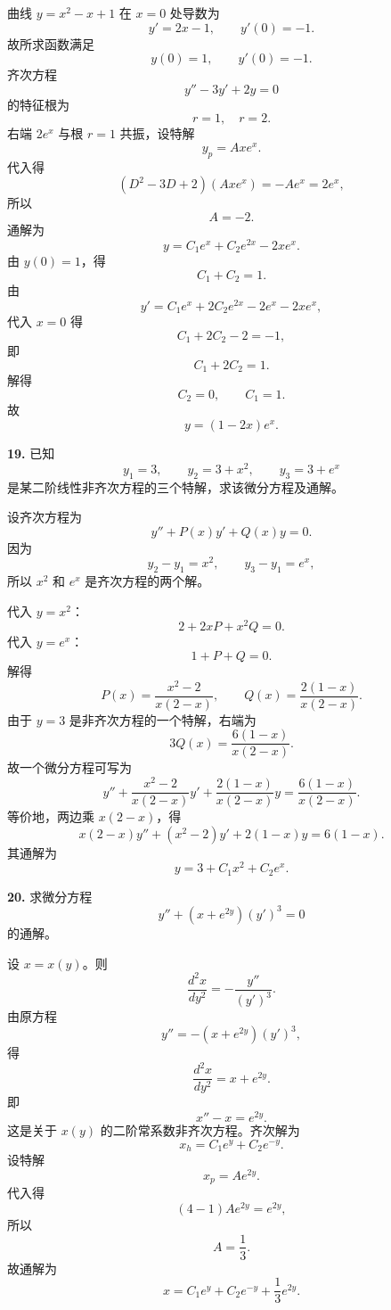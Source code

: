 \begin{solutionblock}
曲线 \(y=x^2-x+1\) 在 \(x=0\) 处导数为
\[
y'=2x-1,\qquad y'(0)=-1.
\]
故所求函数满足
\[
y(0)=1,\qquad y'(0)=-1.
\]
齐次方程
\[
y''-3y'+2y=0
\]
的特征根为
\[
r=1,\quad r=2.
\]
右端 \(2e^x\) 与根 \(r=1\) 共振，设特解
\[
y_p=Axe^x.
\]
代入得
\[
(D^2-3D+2)(Axe^x)=-Ae^x=2e^x,
\]
所以
\[
A=-2.
\]
通解为
\[
y=C_1e^x+C_2e^{2x}-2xe^x.
\]
由 \(y(0)=1\)，得
\[
C_1+C_2=1.
\]
由
\[
y'=C_1e^x+2C_2e^{2x}-2e^x-2xe^x,
\]
代入 \(x=0\) 得
\[
C_1+2C_2-2=-1,
\]
即
\[
C_1+2C_2=1.
\]
解得
\[
C_2=0,\qquad C_1=1.
\]
故
\[
\boxed{y=(1-2x)e^x}.
\]
\end{solutionblock}

\begin{problemblock}
\textbf{19.} 已知
\[
y_1=3,\qquad y_2=3+x^2,\qquad y_3=3+e^x
\]
是某二阶线性非齐次方程的三个特解，求该微分方程及通解。
\end{problemblock}

\begin{solutionblock}
设齐次方程为
\[
y''+P(x)y'+Q(x)y=0.
\]
因为
\[
y_2-y_1=x^2,\qquad y_3-y_1=e^x,
\]
所以 \(x^2\) 和 \(e^x\) 是齐次方程的两个解。

代入 \(y=x^2\)：
\[
2+2xP+x^2Q=0.
\]
代入 \(y=e^x\)：
\[
1+P+Q=0.
\]
解得
\[
P(x)=\frac{x^2-2}{x(2-x)},\qquad
Q(x)=\frac{2(1-x)}{x(2-x)}.
\]
由于 \(y=3\) 是非齐次方程的一个特解，右端为
\[
3Q(x)=\frac{6(1-x)}{x(2-x)}.
\]
故一个微分方程可写为
\[
y''+\frac{x^2-2}{x(2-x)}y'
+\frac{2(1-x)}{x(2-x)}y
=\frac{6(1-x)}{x(2-x)}.
\]
等价地，两边乘 \(x(2-x)\)，得
\[
\boxed{x(2-x)y''+(x^2-2)y'+2(1-x)y=6(1-x)}.
\]
其通解为
\[
\boxed{y=3+C_1x^2+C_2e^x}.
\]
\end{solutionblock}

\begin{problemblock}
\textbf{20.} 求微分方程
\[
y''+(x+e^{2y})(y')^3=0
\]
的通解。
\end{problemblock}

\begin{solutionblock}
设 \(x=x(y)\)。则
\[
\frac{d^2x}{dy^2}=-\frac{y''}{(y')^3}.
\]
由原方程
\[
y''=-(x+e^{2y})(y')^3,
\]
得
\[
\frac{d^2x}{dy^2}=x+e^{2y}.
\]
即
\[
x''-x=e^{2y}.
\]
这是关于 \(x(y)\) 的二阶常系数非齐次方程。齐次解为
\[
x_h=C_1e^y+C_2e^{-y}.
\]
设特解
\[
x_p=Ae^{2y}.
\]
代入得
\[
(4-1)Ae^{2y}=e^{2y},
\]
所以
\[
A=\frac13.
\]
故通解为
\[
\boxed{x=C_1e^y+C_2e^{-y}+\frac13e^{2y}}.
\]
\end{solutionblock}

